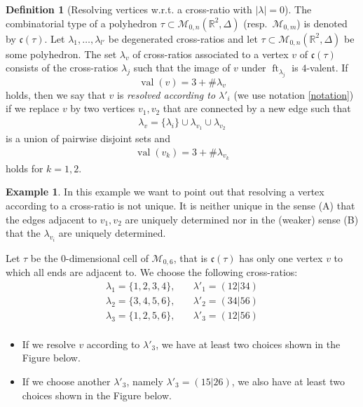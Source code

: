 \documentclass[11pt,reqno,a4]{amsart}
\theoremstyle{dotless}
\theoremstyle{definition}
\newtheorem{definition}[corollary]{Definition}
\newtheorem{example}[corollary]{Example}
\newcommand{\ft}{\operatorname{ft}}
\newcommand{\val}{\operatorname{val}}
\begin{document}
\begin{definition}[Resolving vertices w.r.t. a cross-ratio with $|\lambda|=0$]\label{definition:lambda_v_vertex_trop_curve}
The combinatorial type of a polyhedron $\tau\subset \mathcal{M}_{0,n}\left(\mathbb{R}^2,\Delta \right)$ (resp.\ $\mathcal{M}_{0,m}$) is denoted by $\mathfrak{c}(\tau)$. Let $\lambda_1,\dots,\lambda_{l'}$ be degenerated cross-ratios and let $\tau\subset \mathcal{M}_{0,n}\left(\mathbb{R}^2,\Delta \right)$ be some polyhedron. The set $\lambda_v$ of cross-ratios associated to a vertex $v$ of $\mathfrak{c}(\tau)$ consists of the cross-ratios $\lambda_j$ such that the image of $v$ under $\ft_{\lambda_j}$ is $4$-valent. If $$\val(v)=3+\#\lambda_v$$ holds, then we say that $v$ is \textit{resolved according to $\lambda'_i$} (we use notation \ref{notation}) if we replace $v$ by two vertices $v_1,v_2$ that are connected by a new edge such that
\begin{align*}
\lambda_v=\lbrace\lambda_i\rbrace\cup\lambda_{v_1}\cup\lambda_{v_2}
\end{align*}
is a union of pairwise disjoint sets and
\begin{align*}
\val(v_k)=3+\#\lambda_{v_k}
\end{align*}
holds for $k=1,2$.
\end{definition}


\begin{example}
In this example we want to point out that resolving a vertex according to a cross-ratio is not unique. It is neither unique in the sense (A) that the edges adjacent to $v_1,v_2$ are uniquely determined nor in the (weaker) sense (B) that the $\lambda_{v_i}$ are uniquely determined.

Let $\tau$ be the $0$-dimensional cell of $\mathcal{M}_{0,6}$, that is $\mathfrak{c}(\tau)$ has only one vertex $v$ to which all ends are adjacent to. We choose the following cross-ratios:
\begin{align*}
\lambda_1=\lbrace 1,2,3,4 \rbrace,\quad &\lambda'_1=(12|34)\\
\lambda_2=\lbrace 3,4,5,6 \rbrace,\quad &\lambda'_2=(34|56)\\
\lambda_3=\lbrace 1,2,5,6 \rbrace,\quad &\lambda'_3=(12|56)\\
\end{align*}
\begin{itemize}
\item[(A)]
If we resolve $v$ according to $\lambda'_3$, we have at least two choices shown in the Figure below.
\begin{figure}[H]
\centering
\def\svgwidth{240pt}

\label{Example_resolving_not_unique}
\end{figure}
\item[(B)]
If we choose another $\lambda'_3$, namely $\lambda'_3=(15|26)$, we also have at least two choices shown in the Figure below.
\begin{figure}[H]
\centering
\def\svgwidth{240pt}

\label{Example_resolving_not_unique_2}
\end{figure}
\end{itemize}
\end{example}
\end{document}
